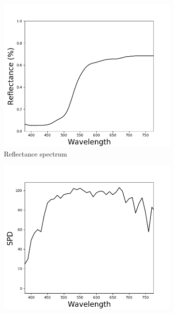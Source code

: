 \begin{figure}[t]
	\centering
	\begin{subfigure}[t]{0.31\textwidth}	
		\captionsetup{justification=centering}
		\includegraphics[width=\linewidth]{img/spectralRepres_reflectance.png}
		\caption{Reflectance spectrum}
		\label{fig:spectralRepres_reflectance}
	\end{subfigure}
	\begin{subfigure}[t]{0.31\textwidth}
	\captionsetup{justification=centering}
	\includegraphics[width=\linewidth]{img/spectralRepres_emission.png}

\end{subfigure}
\end{figure}
